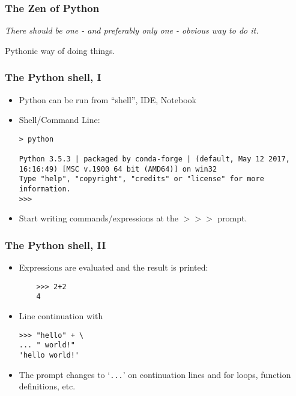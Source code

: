 \begin{frame}[fragile]  \frametitle{The Zen of Python}
{\em \large There should be one - and preferably only one - obvious way	to do it.}



Pythonic way of doing things.
\end{frame}

\begin{frame}[fragile]  \frametitle{The Python shell, I}
  \begin{itemize}
  \item Python can be run from ``shell'', IDE, Notebook
 \item Shell/Command Line:
\begin{lstlisting}
> python

Python 3.5.3 | packaged by conda-forge | (default, May 12 2017, 16:16:49) [MSC v.1900 64 bit (AMD64)] on win32
Type "help", "copyright", "credits" or "license" for more information.
>>>
\end{lstlisting}
\item Start writing commands/expressions at the $>>>$ prompt.
\end{itemize}
\end{frame}

\begin{frame}[fragile]\frametitle{The Python shell, II}
\begin{itemize}
\item Expressions are evaluated and the result is printed:
	\begin{lstlisting}
	>>> 2+2
	4
	\end{lstlisting}

\item Line continuation with \\ 
\begin{lstlisting}
>>> "hello" + \
... " world!"
'hello world!'
\end{lstlisting}
\item The prompt changes to `\texttt{...}' on continuation lines and for loops, function definitions, etc.
\end{itemize}
\end{frame}

